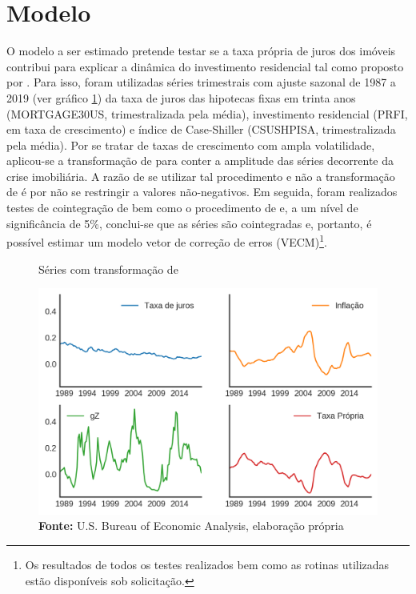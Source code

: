 \section{Modelo}
\label{Modelo_empirico}

O modelo a ser estimado pretende testar se a taxa própria de juros dos imóveis contribui para explicar a dinâmica do investimento residencial tal como proposto por \textcite{teixeira_crescimento_2015}. Para isso, foram utilizadas séries trimestrais com ajuste sazonal de 1987 a 2019 (ver gráfico \ref{YeoJhonson}) da taxa de juros das hipotecas fixas em trinta anos (MORTGAGE30US, trimestralizada pela média), investimento residencial (PRFI, em taxa de crescimento) e índice de Case-Shiller (CSUSHPISA, trimestralizada pela média).
Por se tratar de taxas de crescimento com ampla volatilidade, aplicou-se a transformação de \textcite{yeo_new_2000} para conter a amplitude das séries decorrente da crise imobiliária. A razão de se utilizar tal procedimento e não a transformação de \textcite{box_analysis_1964} é por não se restringir a valores não-negativos. Em seguida, foram realizados testes de cointegração de \textcite{engle_co-integration_1987} bem como o procedimento de \textcite{johansen_estimation_1991} e, a um nível de significância de 5\%, conclui-se que as séries são cointegradas e, portanto, é possível estimar um modelo vetor de correção de erros (VECM)\footnote{Os resultados de todos os testes realizados bem como as rotinas utilizadas estão disponíveis sob solicitação.}.


\begin{figure}[H]
	\centering
	\caption{Séries com transformação de \textcite{yeo_new_2000}}
	\label{YeoJhonson}
	\includegraphics[width=\textwidth]{Fatos_Estilizados/Figs/YeoJohnson.png}
	\caption*{\textbf{Fonte:} U.S. Bureau of Economic Analysis, elaboração própria}
\end{figure}

